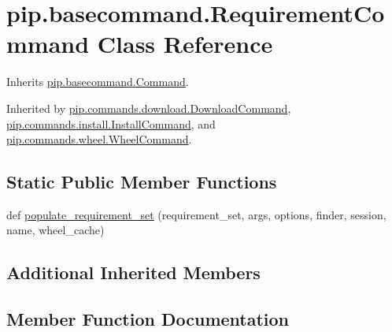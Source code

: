 \hypertarget{classpip_1_1basecommand_1_1_requirement_command}{}\section{pip.\+basecommand.\+Requirement\+Command Class Reference}
\label{classpip_1_1basecommand_1_1_requirement_command}


Inherits \hyperlink{classpip_1_1basecommand_1_1_command}{pip.\+basecommand.\+Command}.



Inherited by \hyperlink{classpip_1_1commands_1_1download_1_1_download_command}{pip.\+commands.\+download.\+Download\+Command}, \hyperlink{classpip_1_1commands_1_1install_1_1_install_command}{pip.\+commands.\+install.\+Install\+Command}, and \hyperlink{classpip_1_1commands_1_1wheel_1_1_wheel_command}{pip.\+commands.\+wheel.\+Wheel\+Command}.

\subsection*{Static Public Member Functions}
\begin{DoxyCompactItemize}
\item 
def \hyperlink{classpip_1_1basecommand_1_1_requirement_command_a632bade6652779fada1df1d6995074e1}{populate\+\_\+requirement\+\_\+set} (requirement\+\_\+set, args, options, finder, session, name, wheel\+\_\+cache)
\end{DoxyCompactItemize}
\subsection*{Additional Inherited Members}


\subsection{Member Function Documentation}
\mbox{\label{classpip_1_1basecommand_1_1_requirement_command_a632bade6652779fada1df1d6995074e1}} 
